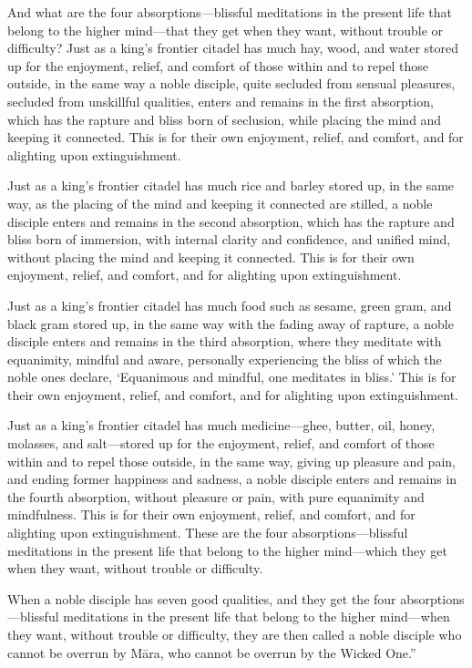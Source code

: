 \documentclass[12pt,openany]{book}%
\begin{document}
And what are the four absorptions—blissful meditations in the present life that belong to the higher mind—that they get when they want, without trouble or difficulty? Just as a king’s frontier citadel has much hay, wood, and water stored up for the enjoyment, relief, and comfort of those within and to repel those outside, in the same way a noble disciple, quite secluded from sensual pleasures, secluded from unskillful qualities, enters and remains in the first absorption, which has the rapture and bliss born of seclusion, while placing the mind and keeping it connected. This is for their own enjoyment, relief, and comfort, and for alighting upon extinguishment. 

Just as a king’s frontier citadel has much rice and barley stored up, in the same way, as the placing of the mind and keeping it connected are stilled, a noble disciple enters and remains in the second absorption, which has the rapture and bliss born of immersion, with internal clarity and confidence, and unified mind, without placing the mind and keeping it connected. This is for their own enjoyment, relief, and comfort, and for alighting upon extinguishment. 

Just as a king’s frontier citadel has much food such as sesame, green gram, and black gram stored up, in the same way with the fading away of rapture, a noble disciple enters and remains in the third absorption, where they meditate with equanimity, mindful and aware, personally experiencing the bliss of which the noble ones declare, ‘Equanimous and mindful, one meditates in bliss.’ This is for their own enjoyment, relief, and comfort, and for alighting upon extinguishment. 

Just as a king’s frontier citadel has much medicine—ghee, butter, oil, honey, molasses, and salt—stored up for the enjoyment, relief, and comfort of those within and to repel those outside, in the same way, giving up pleasure and pain, and ending former happiness and sadness, a noble disciple enters and remains in the fourth absorption, without pleasure or pain, with pure equanimity and mindfulness. This is for their own enjoyment, relief, and comfort, and for alighting upon extinguishment. These are the four absorptions—blissful meditations in the present life that belong to the higher mind—which they get when they want, without trouble or difficulty. 

When a noble disciple has seven good qualities, and they get the four absorptions—blissful meditations in the present life that belong to the higher mind—when they want, without trouble or difficulty, they are then called a noble disciple who cannot be overrun by \textsanskrit{Māra}, who cannot be overrun by the Wicked One.” 
\end{document}

